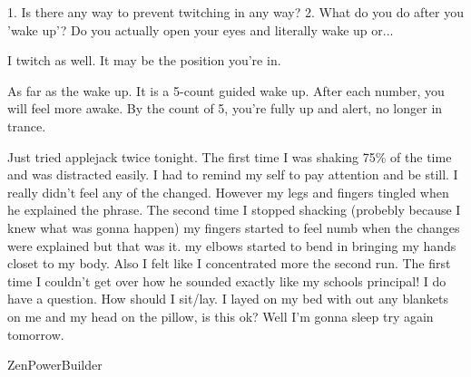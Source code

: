 \documentclass[ebook,12pt,oneside,openany]{memoir}
\newcommand{\mytexttilde}{\raisebox{0.5ex}{\texttildelow}}
\begin{document}
\begin{tcolorbox}[title=C. Thunder Dash,colback=orange!5!white,colframe=orange!75!black,coltitle=white]
\begin{tcolorbox}[title=Moon Wave]
\par{1. Is there any way to prevent twitching in any way?   2.  What do you do after you 'wake up'? Do you actually open your eyes and literally wake up or...}
\end{tcolorbox}
\par{I twitch as well. It may be the position you're in.}
\newline{}
\par{As far as the wake up. It is a 5-count guided wake up. After each number, you will feel more awake. By the count of 5, you're fully up and alert, no longer in trance. }
\end{tcolorbox}
\begin{tcolorbox}[title=ZenPowerBuilder]
\par{Just tried applejack twice tonight.  The first time I was shaking 75\% of the time and was distracted easily. I had to remind my self to pay attention and be still. I really didn't feel any of the changed. However my legs and fingers tingled when he explained the phrase.  The second time I stopped shacking (probebly because I knew what was gonna happen) my fingers started to feel numb when the changes were explained but that was it.  my elbows started to bend in bringing my hands closet to my body.  Also I felt like I concentrated more the second run.  The first time I couldn't get over how he sounded exactly like my schools principal! I do have a question. How should I sit/lay.  I layed on my bed with out any blankets on me and my head on the pillow, is this ok? Well I'm gonna sleep try again tomorrow.}
\newline{}
\par{\mytexttilde{}ZenPowerBuilder}
\end{tcolorbox}
\end{document}
